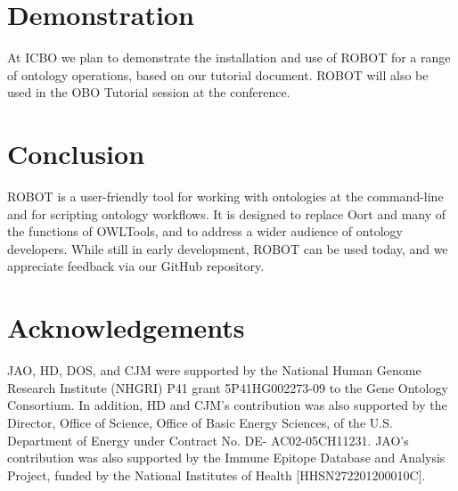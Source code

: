 \documentclass{icbo}
\begin{document}
\section{Demonstration}

At ICBO we plan to demonstrate the installation and use of ROBOT for a range of ontology operations, based on our tutorial document. ROBOT will also be used in the OBO Tutorial session at the conference.


\section{Conclusion}

ROBOT is a user-friendly tool for working with ontologies at the command-line and for scripting ontology workflows. It is designed to replace Oort and many of the functions of OWLTools, and to address a wider audience of ontology developers. While still in early development, ROBOT can be used today, and we appreciate feedback via our GitHub repository.


\section*{Acknowledgements}

JAO, HD, DOS, and CJM were supported by the National Human Genome Research Institute (NHGRI) P41 grant 5P41HG002273-09 to the Gene Ontology Consortium. In addition, HD and CJM’s contribution was also supported by the Director, Office of Science, Office of Basic Energy Sciences, of the U.S. Department of Energy under Contract No. DE- AC02-05CH11231. JAO's contribution was also supported by the Immune Epitope Database and Analysis Project, funded by the National Institutes of Health [HHSN272201200010C].





\end{document}
